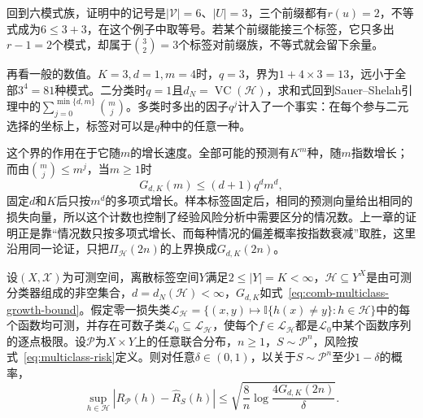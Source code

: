 回到六模式族，证明中的记号是$|\mathcal V|=6$、$|U|=3$，三个前缀都有$r(u)=2$，不等式成为$6\leq3+3$，在这个例子中取等号。若某个前缀能接三个标签，它只多出$r-1=2$个模式，却属于$\binom32=3$个标签对前缀族，不等式就会留下余量。

再看一般的数值。$K=3,d=1,m=4$时，$q=3$，界为$1+4\times3=13$，远小于全部$3^4=81$种模式。二分类时$q=1$且$d_N=\operatorname{VC}(\mathcal H)$，求和式回到Sauer--Shelah引理中的$\sum_{j=0}^{\min\{d,m\}}\binom mj$。多类时多出的因子$q^j$计入了一个事实：在每个参与二元选择的坐标上，标签对可以是$q$种中的任意一种。

这个界的作用在于它随$m$的增长速度。全部可能的预测有$K^m$种，随$m$指数增长；而由$\binom mj\leq m^j$，当$m\geq1$时
\[
 G_{d,K}(m)\leq(d+1)q^dm^d,
\]
固定$d$和$K$后只按$m^d$的多项式增长。样本标签固定后，相同的预测向量给出相同的损失向量，所以这个计数也控制了经验风险分析中需要区分的情况数。上一章的证明正是靠“情况数只按多项式增长、而每种情况的偏差概率按指数衰减”取胜，这里沿用同一论证，只把$\Pi_{\mathcal H}(2n)$的上界换成$G_{d,K}(2n)$。

\begin{theorem}[有限标签的一致收敛保证]
\label{thm:finite-label-uniform-convergence}
设$(X,\mathcal X)$为可测空间，离散标签空间$Y$满足$2\leq|Y|=K<\infty$，$\mathcal H\subseteq Y^X$是由可测分类器组成的非空集合，$d=d_N(\mathcal H)<\infty$，$G_{d,K}$如式~\eqref{eq:comb-multiclass-growth-bound}。假定零一损失类$\mathcal L_{\mathcal H}=\{(x,y)\mapsto\mathbb I\{h(x)\neq y\}:h\in\mathcal H\}$中的每个函数均可测，并存在可数子类$\mathcal L_0\subseteq\mathcal L_{\mathcal H}$，使每个$f\in\mathcal L_{\mathcal H}$都是$\mathcal L_0$中某个函数序列的逐点极限。设$\mathcal P$为$X\times Y$上的任意联合分布，$n\geq1$，$S\sim\mathcal P^n$，风险按式~\eqref{eq:multiclass-risk}定义。则对任意$\delta\in(0,1)$，以关于$S\sim\mathcal P^n$至少$1-\delta$的概率，
\begin{equation}
 \sup_{h\in\mathcal H}|R_{\mathcal P}(h)-\hat R_S(h)|
 \leq\sqrt{\frac8n\log\frac{4G_{d,K}(2n)}{\delta}}.
 \label{eq:finite-label-uniform-bound}
\end{equation}
\end{theorem}

